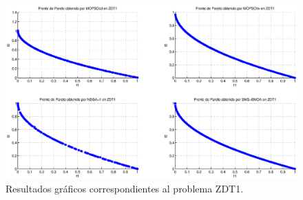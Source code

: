 \newpage
    \begin{figure}
      \centering
	  \includegraphics[scale=0.45]{Cap4/rzdt1r.eps}      
	\caption{Resultados gr\'aficos correspondientes al problema ZDT1.}
      \label{fig:rZDT1}
      \end{figure}
\clearpage
\newpage
